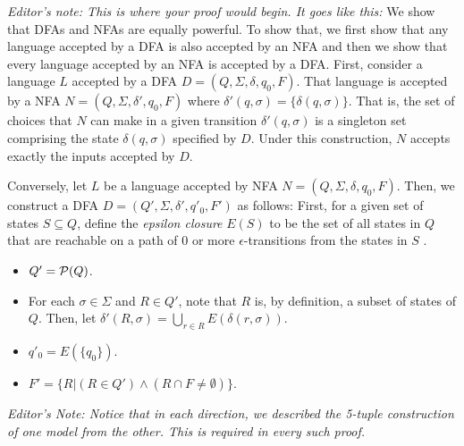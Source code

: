 \documentclass[12pt]{article}
\begin{document}
\emph{Editor's note:  This is where your proof would begin.  It goes like this:}
We show that DFAs and NFAs are equally powerful.  To show that, we first show that any language accepted by a DFA is also accepted by an NFA and then we show that every language accepted by an NFA is accepted by a DFA.  First, consider a language $L$ accepted by a DFA $D = (Q, \Sigma, \delta, q_0, F)$.  That language is accepted by a NFA $N = (Q, \Sigma, \delta', q_0, F)$ where $\delta'(q, \sigma) = \{ \delta(q, \sigma) \}$.  That is, the set of choices that $N$ can make in a given transition $\delta'(q, \sigma)$ is a singleton set comprising the state $\delta(q, \sigma)$ specified by $D$.  Under this construction, $N$  accepts exactly the inputs accepted by $D$.  

Conversely, let $L$ be a language accepted by NFA $N = (Q, \Sigma, \delta, q_0, F)$.  Then, we construct a DFA $D = (Q', \Sigma, \delta', q'_0, F')$ as follows:  
First, for a given set of states $S \subseteq Q$, define the \emph{epsilon closure} $E(S)$ to be the set of all states in $Q$ that are reachable on a path of $0$ or more $\epsilon$-transitions from the states in $S$ .
\begin{itemize}
	\item $Q' = {\cal P}(Q)$.
	\item For each $\sigma \in \Sigma$ and $R \in Q'$, note that $R$ is, by definition, a subset of states of $Q$.  Then, let $\delta'(R, \sigma) = \bigcup_{r \in R}  E(\delta(r, \sigma))$.
	\item $q'_0 = E(\{q_0\})$.
	\item $F' = \{R | (R \in Q') \wedge (R \cap F \neq \emptyset) \}$.
\end{itemize}
\emph{Editor's Note:  Notice that in each direction, we described the 5-tuple construction of one model from the other.  This is required in every such proof.}
\end{document}
